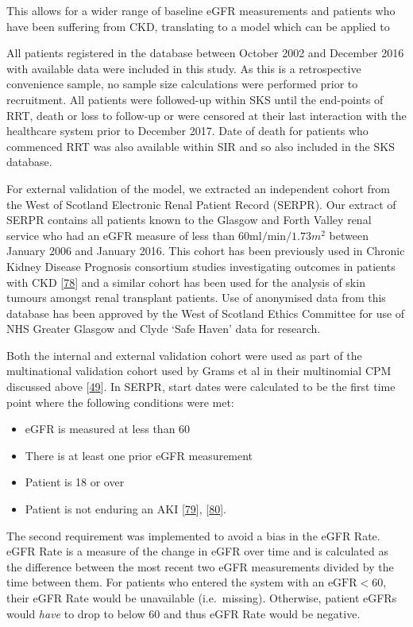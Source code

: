 \documentclass[12pt,PhD,twoside,openright]{muthesis}
\providecommand{\tightlist}{%
  \setlength{\itemsep}{0pt}\setlength{\parskip}{0pt}}
\begin{document}
This allows for a wider range of baseline eGFR measurements and patients who have been suffering from CKD, translating to a model which can be applied to

All patients registered in the database between October 2002 and December 2016 with available data were included in this study. As this is a retrospective convenience sample, no sample size calculations were performed prior to recruitment. All patients were followed-up within SKS until the end-points of RRT, death or loss to follow-up or were censored at their last interaction with the healthcare system prior to December 2017. Date of death for patients who commenced RRT was also available within SIR and so also included in the SKS database.

For external validation of the model, we extracted an independent cohort from the West of Scotland Electronic Renal Patient Record (SERPR). Our extract of SERPR contains all patients known to the Glasgow and Forth Valley renal service who had an eGFR measure of less than \(60\textrm{ml}/\textrm{min}/1.73m^2\) between January 2006 and January 2016. This cohort has been previously used in Chronic Kidney Disease Prognosis consortium studies investigating outcomes in patients with CKD {[}\protect\hyperlink{ref-matsushita_cohort_2013}{78}{]} and a similar cohort has been used for the analysis of skin tumours amongst renal transplant patients. Use of anonymised data from this database has been approved by the West of Scotland Ethics Committee for use of NHS Greater Glasgow and Clyde `Safe Haven' data for research.

Both the internal and external validation cohort were used as part of the multinational validation cohort used by Grams et al in their multinomial CPM discussed above {[}\protect\hyperlink{ref-grams_predicting_2018}{49}{]}. In SERPR, start dates were calculated to be the first time point where the following conditions were met:
\begin{itemize}
\tightlist
\item
  eGFR is measured at less than 60
\item
  There is at least one prior eGFR measurement
\item
  Patient is 18 or over
\item
  Patient is not enduring an AKI {[}\protect\hyperlink{ref-forni_renal_2017-1}{79}{]}, {[}\protect\hyperlink{ref-noauthor_kdigo_2012}{80}{]}.
\end{itemize}
The second requirement was implemented to avoid a bias in the eGFR Rate. eGFR Rate is a measure of the change in eGFR over time and is calculated as the difference between the most recent two eGFR measurements divided by the time between them. For patients who entered the system with an \(\textrm{eGFR} < 60\), their eGFR Rate would be unavailable (i.e.~missing). Otherwise, patient eGFRs would \emph{have} to drop to below 60 and thus eGFR Rate would be negative.
\end{document}
